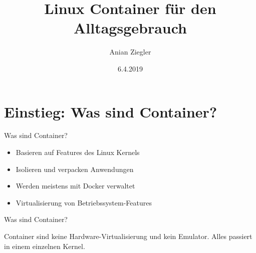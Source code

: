 \documentclass{beamer}
\title{Linux Container für den Alltagsgebrauch}
\date{6.4.2019}
\author{Anian Ziegler}
\institute{Augsburger Linux-Infotag}
\begin{document}
  \maketitle

  \section{Einstieg: Was sind Container?}

  \begin{frame}{Was sind Container?}
    \begin{itemize}[<+->]
      \item Basieren auf Features des Linux Kernels
      \item Isolieren und verpacken Anwendungen
      \item Werden meistens mit Docker verwaltet
      \item \alert{Virtualisierung von Betriebssystem-Features}
    \end{itemize}
  \end{frame}

  \begin{frame}{Was sind Container?}
    \begin{center}
      Container sind keine Hardware-Virtualisierung und kein Emulator.
      Alles passiert in einem einzelnen Kernel.
    \end{center}
  \end{frame}
  
\end{document}
